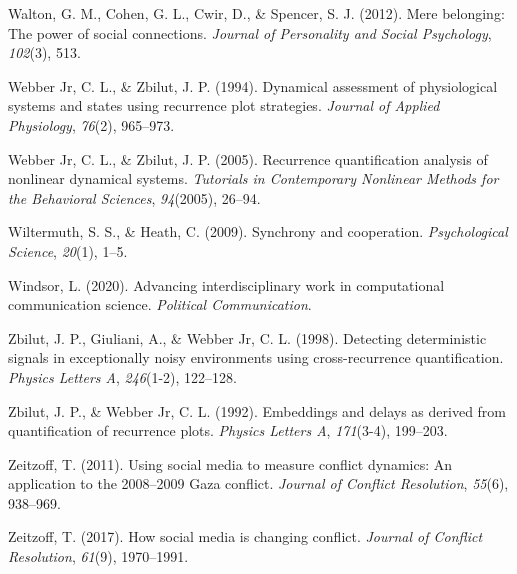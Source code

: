 \documentclass[
  english,
  man]{apa6}
\begin{document}
\leavevmode\hypertarget{ref-walton2012mere}{}%
Walton, G. M., Cohen, G. L., Cwir, D., \& Spencer, S. J. (2012). Mere belonging: The power of social connections. \emph{Journal of Personality and Social Psychology}, \emph{102}(3), 513.

\leavevmode\hypertarget{ref-webber1994dynamical}{}%
Webber Jr, C. L., \& Zbilut, J. P. (1994). Dynamical assessment of physiological systems and states using recurrence plot strategies. \emph{Journal of Applied Physiology}, \emph{76}(2), 965--973.

\leavevmode\hypertarget{ref-webber2005recurrence}{}%
Webber Jr, C. L., \& Zbilut, J. P. (2005). Recurrence quantification analysis of nonlinear dynamical systems. \emph{Tutorials in Contemporary Nonlinear Methods for the Behavioral Sciences}, \emph{94}(2005), 26--94.

\leavevmode\hypertarget{ref-wiltermuth2009synchrony}{}%
Wiltermuth, S. S., \& Heath, C. (2009). Synchrony and cooperation. \emph{Psychological Science}, \emph{20}(1), 1--5.

\leavevmode\hypertarget{ref-Windsor2020}{}%
Windsor, L. (2020). Advancing interdisciplinary work in computational communication science. \emph{Political Communication}.

\leavevmode\hypertarget{ref-zbilut1998detecting}{}%
Zbilut, J. P., Giuliani, A., \& Webber Jr, C. L. (1998). Detecting deterministic signals in exceptionally noisy environments using cross-recurrence quantification. \emph{Physics Letters A}, \emph{246}(1-2), 122--128.

\leavevmode\hypertarget{ref-zbilut1992embeddings}{}%
Zbilut, J. P., \& Webber Jr, C. L. (1992). Embeddings and delays as derived from quantification of recurrence plots. \emph{Physics Letters A}, \emph{171}(3-4), 199--203.

\leavevmode\hypertarget{ref-zeitzoff2011using}{}%
Zeitzoff, T. (2011). Using social media to measure conflict dynamics: An application to the 2008--2009 Gaza conflict. \emph{Journal of Conflict Resolution}, \emph{55}(6), 938--969.

\leavevmode\hypertarget{ref-zeitzoff2017social}{}%
Zeitzoff, T. (2017). How social media is changing conflict. \emph{Journal of Conflict Resolution}, \emph{61}(9), 1970--1991.

\endgroup
\end{document}

